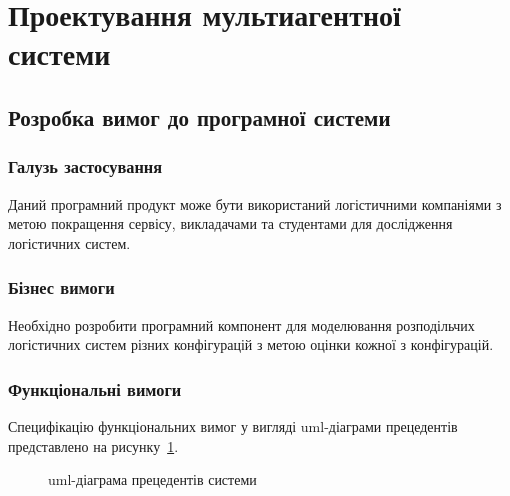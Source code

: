 
\section{Проектування мультиагентної системи}
\subsection{Розробка вимог до програмної системи}
\subsubsection{Галузь застосування}
Даний програмний продукт може бути використаний логістичними компаніями з метою покращення сервісу, викладачами та студентами для дослідження логістичних систем.

\subsubsection{Бізнес вимоги}
Необхідно розробити програмний компонент для моделювання розподільчих логістичних систем різних конфігурацій з метою оцінки кожної з конфігурацій.

\subsubsection{Функціональні вимоги}
Специфікацію функціональних вимог у вигляді \acrshort{uml}-діаграми прецедентів представлено на рисунку~\ref{fig:system_usecase}.

\begin{figure}[H]
	\centering


	\caption{\acrshort{uml}-діаграма прецедентів системи}
	\label{fig:system_usecase}
\end{figure}

